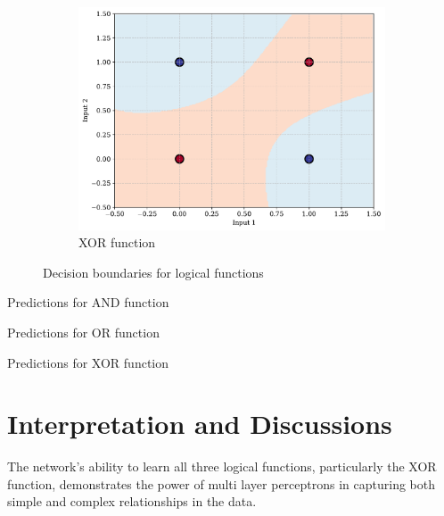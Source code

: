 \documentclass[11pt,a4paper]{article}
\begin{document}
\begin{figure}[H]
{\begin{minipage}{0.98\textwidth}
\begin{subfigure}[b]{0.48\textwidth}
        \centering
        \includegraphics[width=\textwidth]{img/xor_boundary.pdf}
        \caption{XOR function}
        \label{fig:xor_boundary}
    \end{subfigure}
    \caption{Decision boundaries for logical functions}
    \label{fig:decision_boundaries}
    \end{minipage}
    }
\end{figure}

\begin{table}[H]
    \centering
    \caption{Predictions for AND function}
    \label{tab:and_pred}
\end{table}

\begin{table}[H]
    \centering
    \caption{Predictions for OR function}
    \label{tab:or_pred}
\end{table}

\begin{table}[H]
    \centering
    \caption{Predictions for XOR function}
    \label{tab:xor_pred}
\end{table}

\section{Interpretation and Discussions}
\label{sec:discussion}
The network's ability to learn all three logical functions, particularly the XOR function, demonstrates the power of multi layer perceptrons in capturing both simple and complex relationships in the data.
\end{document}
